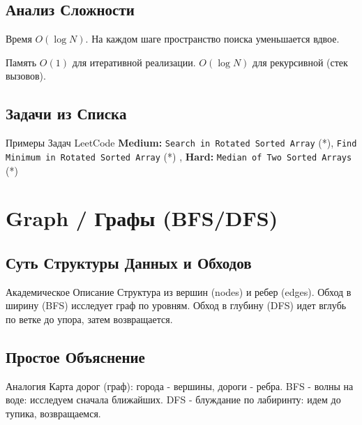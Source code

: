 \subsection{Анализ Сложности}
\begin{myblock}{Время}
    $O(\log N)$. На каждом шаге пространство поиска уменьшается вдвое.
\end{myblock}
\begin{myblock}{Память}
    $O(1)$ для итеративной реализации. $O(\log N)$ для рекурсивной (стек вызовов).
\end{myblock}

\subsection{Задачи из Списка}
\begin{myblock}{Примеры Задач LeetCode}
    \textbf{Medium:} \texttt{Search in Rotated Sorted Array} (*), \texttt{Find Minimum in Rotated Sorted Array} (*) \sep
    \textbf{Hard:} \texttt{Median of Two Sorted Arrays} (*)
\end{myblock}

\section{Graph / Графы (BFS/DFS)}

\subsection{Суть Структуры Данных и Обходов}
\begin{myblock}{Академическое Описание}
    Структура из вершин (nodes) и ребер (edges). Обход в ширину (BFS) исследует граф по уровням. Обход в глубину (DFS) идет вглубь по ветке до упора, затем возвращается.
\end{myblock}

\subsection{Простое Объяснение}
\begin{myblock}{Аналогия}
    Карта дорог (граф): города - вершины, дороги - ребра. BFS - волны на воде: исследуем сначала ближайших. DFS - блуждание по лабиринту: идем до тупика, возвращаемся.
\end{myblock}


